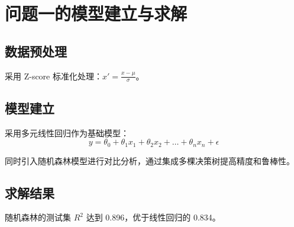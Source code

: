 \section{问题一的模型建立与求解}

\subsection{数据预处理}

采用 Z-score 标准化处理：$x' = \frac{x - \mu}{\sigma}$。

\subsection{模型建立}

采用多元线性回归作为基础模型：
\[
  y = \theta_0 + \theta_1 x_1 + \theta_2 x_2 + \dots + \theta_n x_n + \epsilon
\]

同时引入随机森林模型进行对比分析，通过集成多棵决策树提高精度和鲁棒性。

\subsection{求解结果}

随机森林的测试集 $R^2$ 达到 0.896，优于线性回归的 0.834。
